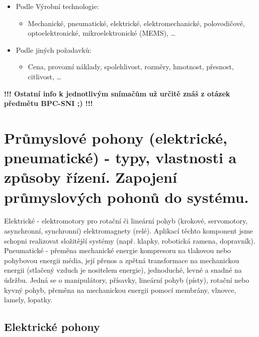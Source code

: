 \begin{itemize}
\begin{itemize}
  \end{itemize}
  \item Podle Výrobní technologie: \begin{itemize}
    \item Mechanické, pneumatické, elektrické, elektromechanické, polovodičové, optoelektronické, mikroelektronické (MEMS), \dots
  \end{itemize}
  \item Podle jiných požadavků: \begin{itemize}
    \item Cena, provozní náklady, spolehlivost, rozměry, hmotnost, přesnost, citlivost, \dots
  \end{itemize}
\end{itemize}

\textbf{!!! Ostatní info k jednotlivým snímačům už určitě znáš z otázek předmětu BPC-SNI ;) !!!
}

\section{Průmyslové pohony (elektrické, pneumatické) - typy, vlastnosti a způsoby řízení. Zapojení průmyslových pohonů do
systému.}
Elektrické - elektromotory pro rotační či lineární pohyb (krokové, servomotory, asynchronní, synchronní) elektromagnety (relé). Aplikací těchto komponent jsme schopni realizovat složitější systémy (např. klapky, robotická ramena, dopravník).
\\
Pneumatické - přeměna mechanické energie kompresoru na tlakovou nebo pohybovou energii média, její přenos a zpětná transformace na mechanickou energii (stlačený vzduch je nositelem energie), jednoduché, levné a snadné na údržbu. Jedná se o manipulátory, přísavky, lineární pohyb (písty), rotační nebo kyvný pohyb, přeměna na mechanickou energii pomocí membrány, vlnovce, lamely, lopatky.

\subsection{Elektrické pohony}
